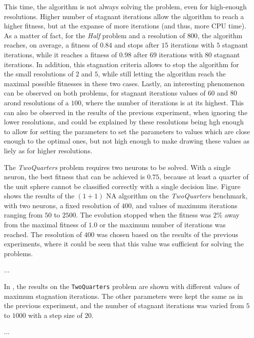 This time, the algorithm is not always solving the problem, even for high-enough resolutions. Higher number of stagnant iterations allow the algorithm to reach a higher fitness, but at the
expanse of more iterations (and thus, more CPU time). As a matter of fact, for the \textit{Half} problem and a resolution of $800$, the algorithm reaches, on average, a fitness of
$0.84$ and stops after $15$ iterations with $5$ stagnant iterations, while it reaches a fitness of $0.98$ after $69$ iterations with $80$ stagnant iterations.
In addition, this stagnation criteria allows to stop the algorithm for the small resolutions of $2$ and $5$, while still letting the algorithm reach the maximal possible fitnesses in these
two cases. Lastly, an interesting phenomenon can be observed on both problems, for stagnant iterations values of $60$ and $80$ arond resolutions of a $100$, where the number of iterations
is at its highest. This can also be observed in the results of the previous experiment, when ignoring the lower resolutions, and could be explained by these resolutions being hgh enough
to allow for setting the parameters to set the parameters to values which are close enough to the optimal ones, but not high enough to make drawing these values as liely as for higher resolutions.

The \textit{TwoQuarters} problem requires two neurons to be solved. With a single neuron, the best fitness that can be achieved is $0.75$, because at least a quarter of the unit sphere
cannot be classified correctly with a single decision line. Figure  shows the results of the $(1 + 1)$ NA algorithm on the \textit{TwoQuarters} benchmark, with two neurons,
a fixed resolution of $400$, and values of maximum iterations ranging from $50$ to $2500$. The evolution stopped when the fitness was $2\%$ away from the maximal fitness of $1.0$ or
the maximum number of iterations was reached. The resolution of $400$ was chosen based on the results of the previous experiments, where it could be seen that this value was sufficient for
solving the problems.

... %

In , the results on the \texttt{TwoQuarters} problem are shown with different values of maximum stagnation iterations. The other parameters were kept the same as in the previous
experiment, and the number of stagnant iterations was varied from $5$ to $1000$ with a step size of $20$.

... %

